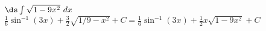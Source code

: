 {$\ds \int \sqrt{1-9x^2}\ dx$
}
{$\frac16\sin^{-1}(3x)+\frac32\sqrt{1/9-x^2}+C=\frac16\sin^{-1}(3x)+\frac{1}{2}x\sqrt{1-9x^2}+C$
}